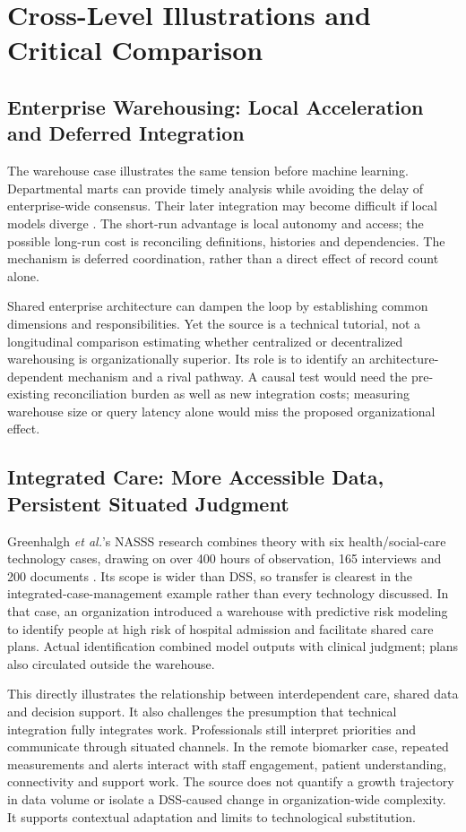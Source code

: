 \documentclass[journal]{IEEEtran}
\begin{document}
\section{Cross-Level Illustrations and Critical Comparison}
\subsection{Enterprise Warehousing: Local Acceleration and Deferred Integration}
The warehouse case illustrates the same tension before machine learning. Departmental marts can provide timely analysis while avoiding the delay of enterprise-wide consensus. Their later integration may become difficult if local models diverge \cite{chaudhuri1997}. The short-run advantage is local autonomy and access; the possible long-run cost is reconciling definitions, histories and dependencies. The mechanism is deferred coordination, rather than a direct effect of record count alone.

Shared enterprise architecture can dampen the loop by establishing common dimensions and responsibilities. Yet the source is a technical tutorial, not a longitudinal comparison estimating whether centralized or decentralized warehousing is organizationally superior. Its role is to identify an architecture-dependent mechanism and a rival pathway. A causal test would need the pre-existing reconciliation burden as well as new integration costs; measuring warehouse size or query latency alone would miss the proposed organizational effect.

\subsection{Integrated Care: More Accessible Data, Persistent Situated Judgment}
Greenhalgh \emph{et al.}'s NASSS research combines theory with six health/social-care technology cases, drawing on over 400 hours of observation, 165 interviews and 200 documents \cite{Greenhalgh2017}. Its scope is wider than DSS, so transfer is clearest in the integrated-case-management example rather than every technology discussed. In that case, an organization introduced a warehouse with predictive risk modeling to identify people at high risk of hospital admission and facilitate shared care plans. Actual identification combined model outputs with clinical judgment; plans also circulated outside the warehouse.

This directly illustrates the relationship between interdependent care, shared data and decision support. It also challenges the presumption that technical integration fully integrates work. Professionals still interpret priorities and communicate through situated channels. In the remote biomarker case, repeated measurements and alerts interact with staff engagement, patient understanding, connectivity and support work. The source does not quantify a growth trajectory in data volume or isolate a DSS-caused change in organization-wide complexity. It supports contextual adaptation and limits to technological substitution.
\end{document}
